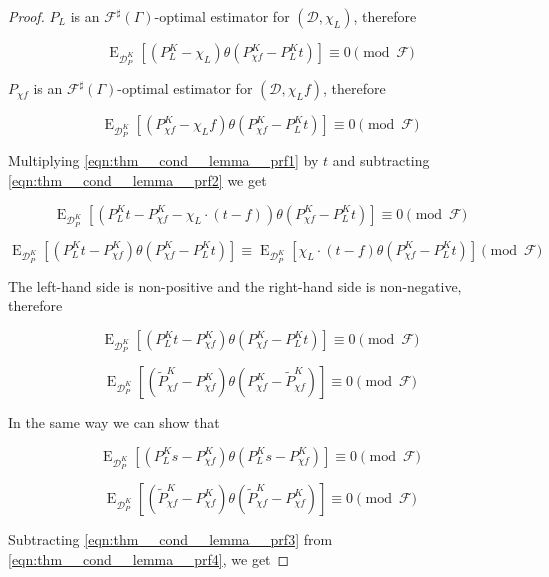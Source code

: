 \documentclass[11pt]{article}
\numberwithin{equation}{section}
\theoremstyle{definition}
\theoremstyle{plain}
\DeclareMathOperator{\E}{E}
\newcommand{\Dist}{\mathcal{D}}
\newcommand{\Fall}{\mathcal{F}}
\newcommand{\ESG}{\Fall^\sharp(\Gamma)}
\begin{document}
\begin{proof}

$P_L$ is an $\ESG$-optimal estimator for $(\Dist, \chi_L)$, therefore

\begin{equation}
\label{eqn:thm__cond__lemma__prf1}
\E_{\Dist_P^K}[(P_L^K- \chi_L) \theta(P_{\chi f}^K- P_L^K t)] \equiv 0 \pmod \Fall
\end{equation}

$P_{\chi f}$ is an $\ESG$-optimal estimator for $(\Dist, \chi_L f)$, therefore

\begin{equation}
\label{eqn:thm__cond__lemma__prf2}
\E_{\Dist_P^K}[(P_{\chi f}^K - \chi_L f) \theta(P_{\chi f}^K - P_L^K t)] \equiv 0 \pmod \Fall
\end{equation}

Multiplying \ref{eqn:thm__cond__lemma__prf1} by $t$ and subtracting \ref{eqn:thm__cond__lemma__prf2} we get

\[\E_{\Dist_P^K}[(P_L^K t - P_{\chi f}^K - \chi_L \cdot (t - f)) \theta(P_{\chi f}^K- P_L^K t)] \equiv 0 \pmod \Fall\]

\[\E_{\Dist_P^K}[(P_L^K t - P_{\chi f}^K ) \theta(P_{\chi f}^K- P_L^K t)] \equiv \E_{\Dist_P^K}[\chi_L \cdot (t- f) \theta(P_{\chi f}^K- P_L^K t)] \pmod \Fall\]

The left-hand side is non-positive and the right-hand side is non-negative, therefore

\[\E_{\Dist_P^K}[(P_L^K t - P_{\chi f}^K ) \theta(P_{\chi f}^K- P_L^K t)] \equiv 0 \pmod \Fall\]

\begin{equation}
\label{eqn:thm__cond__lemma__prf3}
\E_{\Dist_P^K}[(\tilde{P}_{\chi f}^K - P_{\chi f}^K) \theta(P_{\chi f}^K - \tilde{P}_{\chi f}^K)] \equiv 0 \pmod \Fall
\end{equation}

In the same way we can show that

\[\E_{\Dist_P^K}[(P_L^K s - P_{\chi f}^K) \theta(P_L^K s-P_{\chi f}^K)] \equiv 0 \pmod \Fall\]

\begin{equation}
\label{eqn:thm__cond__lemma__prf4}
\E_{\Dist_P^K}[(\tilde{P}_{\chi f}^K - P_{\chi f}^K) \theta(\tilde{P}_{\chi f}^K-P_{\chi f}^K )] \equiv 0 \pmod \Fall
\end{equation}

Subtracting \ref{eqn:thm__cond__lemma__prf3} from \ref{eqn:thm__cond__lemma__prf4}, we get


\end{proof}
\end{document}
